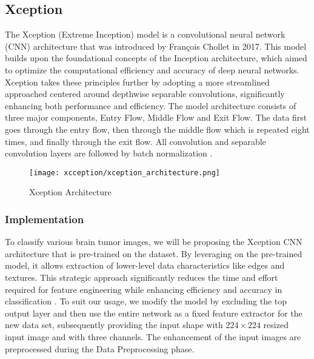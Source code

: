 \subsection{Xception}\label{xception}


The Xception (Extreme Inception) model is a convolutional neural network (CNN) architecture that was introduced by François Chollet in 2017. This model builds upon the foundational concepts of the Inception architecture, which aimed to optimize the computational efficiency and accuracy of deep neural networks. Xception takes these principles further by adopting a more streamlined approached centered around depthwise separable convolutions, significantly enhancing both performance and efficiency. The model architecture consists of three major components, Entry Flow, Middle Flow and Exit Flow. The data first goes through the entry flow, then through the middle flow which is repeated eight times, and finally through the exit flow. All convolution and separable convolution layers are followed by batch normalization \cite{François Chollet}.

\begin{figure}[H]
  \begin{center}
    \texttt{[image: xcception/xception\_architecture.png]}
  \end{center}
  \caption{Xception Architecture}\label{f:xception_architecture}
\end{figure}


\subsubsection{Implementation}

To classify various brain tumor images, we will be proposing the Xception CNN architecture that is pre-trained on the \cite{ImageNet} dataset. By leveraging on the pre-trained model, it allows extraction of lower-level data characteristics like edges and textures. This strategic approach significantly reduces the time and effort required for feature engineering while enhancing efficiency and accuracy in classification \cite{Pre-trained Model}. To suit our usage, we modify the model by excluding the top output layer and then use the entire network as a fixed feature extractor for the new data set, subsequently providing the input shape with $224\times224$ resized input image and with three channels. The enhancement of the input images are preprocessed during the Data Preprocessing phase.

